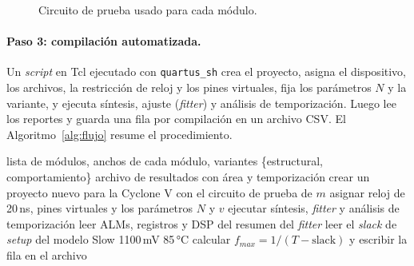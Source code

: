 \documentclass[11pt,letterpaper]{article}
\begin{document}
\begin{figure}[H]
\centering
{}
\caption{Circuito de prueba usado para cada módulo.}
\label{fig:banco}
\end{figure}

\paragraph{Paso 3: compilación automatizada.} Un \emph{script} en Tcl ejecutado con
\texttt{quartus\_sh} crea el proyecto, asigna el dispositivo, los archivos, la restricción de reloj
y los pines virtuales, fija los parámetros $N$ y la variante, y ejecuta síntesis, ajuste
(\emph{fitter}) y análisis de temporización. Luego lee los reportes y guarda una fila por
compilación en un archivo CSV. El Algoritmo~\ref{alg:flujo} resume el procedimiento.

\begin{algorithm}[H]
\caption{Flujo de compilación y medición}
\label{alg:flujo}
\begin{algorithmic}[1]
\Require lista de módulos, anchos de cada módulo, variantes \{estructural, comportamiento\}
\Ensure archivo de resultados con área y temporización
            \State crear un proyecto nuevo para la Cyclone V con el circuito de prueba de $m$
            \State asignar reloj de 20\,ns, pines virtuales y los parámetros $N$ y $v$
            \State ejecutar síntesis, \emph{fitter} y análisis de temporización
            \State leer ALMs, registros y DSP del resumen del \emph{fitter}
            \State leer el \emph{slack} de \emph{setup} del modelo Slow 1100\,mV 85\,°C
            \State calcular $f_{max} = 1/(T - \text{slack})$ y escribir la fila en el archivo
        \EndFor
    \EndFor
\EndFor
\end{algorithmic}
\end{algorithm}
\end{document}
